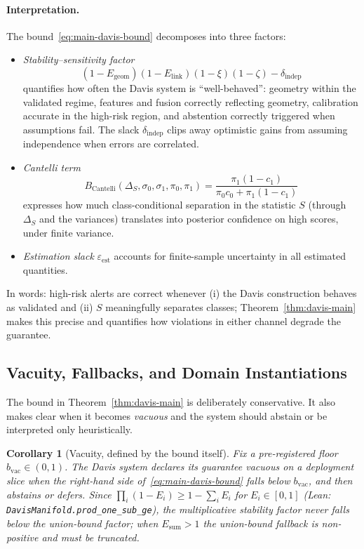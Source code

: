 \documentclass[11pt]{article}
\newtheorem{corollary}{Corollary}
\theoremstyle{remark}
\theoremstyle{plain}
\begin{document}
\paragraph{Interpretation.}
The bound~\eqref{eq:main-davis-bound} decomposes into three factors:
\begin{itemize}[leftmargin=2em]
  \item \emph{Stability–sensitivity factor}
    \[
    (1-E_{\mathrm{geom}})(1-E_{\mathrm{link}})(1-\xi)(1-\zeta) - \delta_{\mathrm{indep}}
    \]
    quantifies how often the Davis system is “well-behaved”: geometry within the validated
    regime, features and fusion correctly reflecting geometry, calibration accurate in the
    high-risk region, and abstention correctly triggered when assumptions fail. The slack
    $\delta_{\mathrm{indep}}$ clips away optimistic gains from assuming independence when errors
    are correlated.

  \item \emph{Cantelli term}
    \[
    B_{\mathrm{Cantelli}}(\Delta_S,\sigma_0,\sigma_1,\pi_0,\pi_1)
    =
    \frac{\pi_1 (1-c_1)}{\pi_0 c_0 + \pi_1 (1-c_1)}
    \]
    expresses how much class-conditional separation in the statistic $S$ (through $\Delta_S$ and
    the variances) translates into posterior confidence on high scores, under finite variance.

  \item \emph{Estimation slack} $\varepsilon_{\mathrm{est}}$ accounts for finite-sample uncertainty in
    all estimated quantities.
\end{itemize}
In words: high-risk alerts are correct whenever (i) the Davis construction behaves as validated
and (ii) $S$ meaningfully separates classes; Theorem~\ref{thm:davis-main} makes this precise and
quantifies how violations in either channel degrade the guarantee.

\subsection{Vacuity, Fallbacks, and Domain Instantiations}

The bound in Theorem~\ref{thm:davis-main} is deliberately conservative. It also makes clear when
it becomes \emph{vacuous} and the system should abstain or be interpreted only heuristically.

\begin{corollary}[Vacuity, defined by the bound itself]
\label{cor:vacuity}
Fix a pre-registered floor $b_{\mathrm{vac}} \in (0,1)$. The Davis system declares its guarantee
\emph{vacuous} on a deployment slice when the right-hand side of~\eqref{eq:main-davis-bound} falls below
$b_{\mathrm{vac}}$, and then abstains or defers. Since $\prod_i (1-E_i) \ge 1 - \sum_i E_i$ for $E_i \in [0,1]$
(Lean: \texttt{DavisManifold.prod\_one\_sub\_ge}), the multiplicative stability factor never falls below the
union-bound factor; when $E_{\mathrm{sum}} > 1$ the union-bound fallback is non-positive and must be truncated.
\end{corollary}
\end{document}
